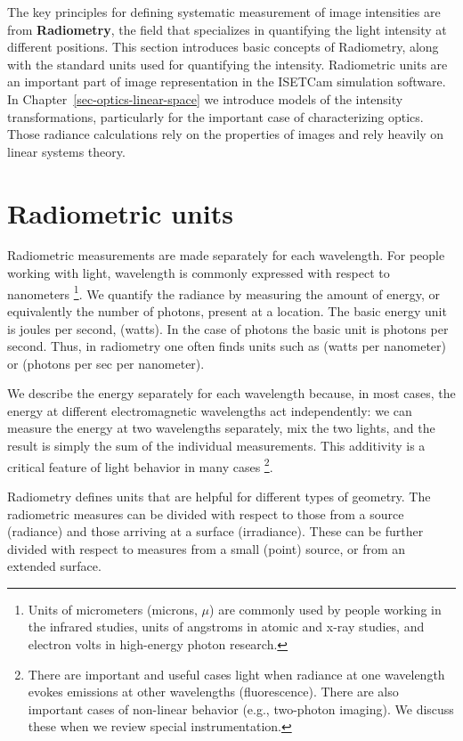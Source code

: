 \documentclass[
  letterpaper,
]{book}
\begin{document}
The key principles for defining systematic measurement of image
intensities are from \textbf{Radiometry}, the field that specializes in
quantifying the light intensity at different positions. This section
introduces basic concepts of Radiometry, along with the standard units
used for quantifying the intensity. Radiometric units are an important
part of image representation in the ISETCam simulation software. In
Chapter~\ref{sec-optics-linear-space} we introduce models of the
intensity transformations, particularly for the important case of
characterizing optics. Those radiance calculations rely on the
properties of images and rely heavily on linear systems theory.

\section{Radiometric units}\label{radiometric-units}

Radiometric measurements are made separately for each wavelength. For
people working with light, wavelength is commonly expressed with respect
to nanometers \footnote{Units of micrometers (microns, \(\mu\)) are
  commonly used by people working in the infrared studies, units of
  angstroms in atomic and x-ray studies, and electron volts in
  high-energy photon research.}. We quantify the radiance by measuring
the amount of energy, or equivalently the number of photons, present at
a location. The basic energy unit is joules per second, (watts). In the
case of photons the basic unit is photons per second. Thus, in
radiometry one often finds units such as (watts per nanometer) or
(photons per sec per nanometer).

We describe the energy separately for each wavelength because, in most
cases, the energy at different electromagnetic wavelengths act
independently: we can measure the energy at two wavelengths separately,
mix the two lights, and the result is simply the sum of the individual
measurements. This additivity is a critical feature of light behavior in
many cases \footnote{There are important and useful cases light when
  radiance at one wavelength evokes emissions at other wavelengths
  (fluorescence). There are also important cases of non-linear behavior
  (e.g., two-photon imaging). We discuss these when we review special
  instrumentation.}.

Radiometry defines units that are helpful for different types of
geometry. The radiometric measures can be divided with respect to those
from a source (radiance) and those arriving at a surface (irradiance).
These can be further divided with respect to measures from a small
(point) source, or from an extended surface.
\end{document}
